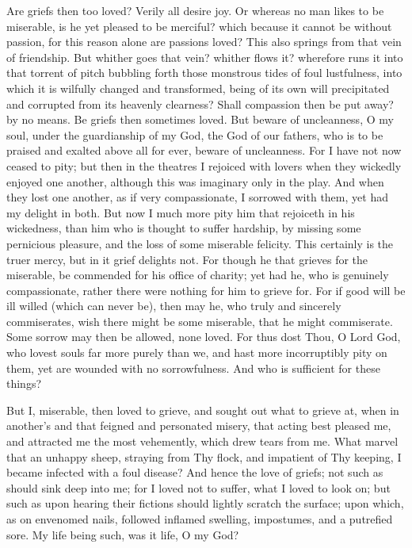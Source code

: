\documentclass[b5paper,openright,12pt,twoside]{book}
\begin{document}
Are griefs then too loved? Verily all desire joy. Or whereas no man
likes to be miserable, is he yet pleased to be merciful? which because
it cannot be without passion, for this reason alone are passions loved?
This also springs from that vein of friendship. But whither goes that
vein? whither flows it? wherefore runs it into that torrent of pitch
bubbling forth those monstrous tides of foul lustfulness, into which it
is wilfully changed and transformed, being of its own will precipitated
and corrupted from its heavenly clearness? Shall compassion then be
put away? by no means. Be griefs then sometimes loved. But beware of
uncleanness, O my soul, under the guardianship of my God, the God of our
fathers, who is to be praised and exalted above all for ever, beware of
uncleanness. For I have not now ceased to pity; but then in the theatres
I rejoiced with lovers when they wickedly enjoyed one another, although
this was imaginary only in the play. And when they lost one another, as
if very compassionate, I sorrowed with them, yet had my delight in both.
But now I much more pity him that rejoiceth in his wickedness, than him
who is thought to suffer hardship, by missing some pernicious pleasure,
and the loss of some miserable felicity. This certainly is the truer
mercy, but in it grief delights not. For though he that grieves for the
miserable, be commended for his office of charity; yet had he, who is
genuinely compassionate, rather there were nothing for him to grieve
for. For if good will be ill willed (which can never be), then may
he, who truly and sincerely commiserates, wish there might be some
miserable, that he might commiserate. Some sorrow may then be allowed,
none loved. For thus dost Thou, O Lord God, who lovest souls far more
purely than we, and hast more incorruptibly pity on them, yet are
wounded with no sorrowfulness. And who is sufficient for these things?

But I, miserable, then loved to grieve, and sought out what to grieve
at, when in another's and that feigned and personated misery, that
acting best pleased me, and attracted me the most vehemently, which
drew tears from me. What marvel that an unhappy sheep, straying from
Thy flock, and impatient of Thy keeping, I became infected with a foul
disease? And hence the love of griefs; not such as should sink deep into
me; for I loved not to suffer, what I loved to look on; but such as upon
hearing their fictions should lightly scratch the surface; upon which,
as on envenomed nails, followed inflamed swelling, impostumes, and a
putrefied sore. My life being such, was it life, O my God?
\end{document}

